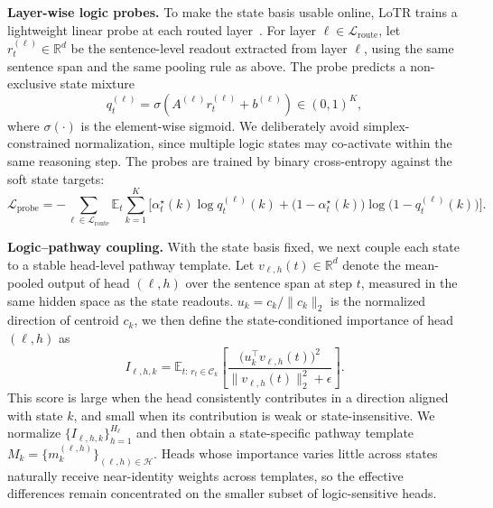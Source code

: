 \textbf{Layer-wise logic probes.}
To make the state basis usable online, LoTR trains a lightweight linear probe at each routed layer~\citep{alain2016understanding}. For layer $\ell\in\mathcal{L}_{\mathrm{route}}$, let $r_t^{(\ell)}\in\mathbb{R}^d$ be the sentence-level readout extracted from layer $\ell$, using the same sentence span and the same pooling rule as above. The probe predicts a non-exclusive state mixture
\begin{equation}
q_t^{(\ell)}=\sigma\!\left(A^{(\ell)}r_t^{(\ell)}+b^{(\ell)}\right)\in(0,1)^K,
\label{eq:lotr_probe}
\end{equation}
where $\sigma(\cdot)$ is the element-wise sigmoid. We deliberately avoid simplex-constrained normalization, since multiple logic states may co-activate within the same reasoning step. The probes are trained by binary cross-entropy against the soft state targets:
\begin{equation}
\mathcal{L}_{\mathrm{probe}}
=
-\sum_{\ell\in\mathcal{L}_{\mathrm{route}}}
\mathbb{E}_{t}
\sum_{k=1}^{K}
\Big[
\alpha_t^\star(k)\log q_t^{(\ell)}(k)
+
\big(1-\alpha_t^\star(k)\big)\log\!\big(1-q_t^{(\ell)}(k)\big)
\Big].
\label{eq:lotr_probe_loss}
\end{equation}

\vspace{-0.5mm}
\textbf{Logic--pathway coupling.}
With the state basis fixed, we next couple each state to a stable head-level pathway template. Let $v_{\ell,h}(t)\in\mathbb{R}^d$ denote the mean-pooled output of head $(\ell,h)$ over the sentence span at step $t$, measured in the same hidden space as the state readouts. $u_k=c_k/\|c_k\|_2$ is the normalized direction of centroid $c_k$, we then define the state-conditioned importance of head $(\ell,h)$ as
\begin{equation}
I_{\ell,h,k}
=
\mathbb{E}_{t:\, r_t\in\mathcal{C}_k}
\left[
\frac{\big(u_k^\top v_{\ell,h}(t)\big)^2}
{\|v_{\ell,h}(t)\|_2^2+\epsilon}
\right].
\label{eq:lotr_importance}
\end{equation}
This score is large when the head consistently contributes in a direction aligned with state $k$, and small when its contribution is weak or state-insensitive. We normalize $\{I_{\ell,h,k}\}_{h=1}^{H_\ell}$ and then obtain a state-specific pathway template $M_k=\{m_k^{(\ell,h)}\}_{(\ell,h)\in\mathcal{H}}$. Heads whose importance varies little across states naturally receive near-identity weights across templates, so the effective differences remain concentrated on the smaller subset of logic-sensitive heads.

